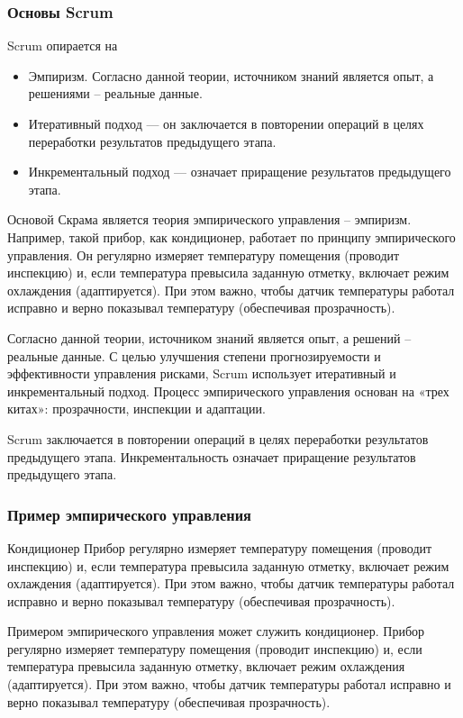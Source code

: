 \documentclass{../industrial-development}
\begin{document}
\begin{frame} \frametitle{Основы Scrum}
  \begin{block}{Scrum опирается на}
\begin{itemize}
\item \alert{Эмпиризм.} Согласно данной теории, источником знаний является опыт, а решениями – реальные данные.
\item \alert{Итеративный подход} --- он заключается в повторении операций в целях переработки результатов предыдущего этапа.
\item	\alert{Инкрементальный подход} ---  означает приращение результатов предыдущего этапа.
\end{itemize} 
	\end{block}
 \end{frame} 

\lecturenotes
Основой Скрама является теория эмпирического управления – эмпиризм. Например, такой прибор, как кондиционер, работает по принципу эмпирического управления. Он регулярно измеряет температуру помещения (проводит инспекцию) и, если температура превысила заданную отметку, включает режим охлаждения (адаптируется). При этом важно, чтобы датчик температуры работал исправно и верно показывал температуру (обеспечивая прозрачность).

Согласно данной теории, источником знаний является опыт, а решений – реальные данные. С целью улучшения степени прогнозируемости и эффективности управления рисками, Scrum использует итеративный и инкрементальный подход. Процесс эмпирического управления основан на «трех китах»: прозрачности, инспекции и адаптации.

 Scrum заключается в повторении операций в целях переработки результатов предыдущего этапа. \alert{Инкрементальность} означает приращение результатов предыдущего этапа. 

\begin{frame} \frametitle{Пример эмпирического управления}
  \begin{block}{Кондиционер}
Прибор \alert{регулярно} измеряет температуру помещения \alert{(проводит инспекцию)} и, если температура превысила заданную отметку, включает режим охлаждения \alert{(адаптируется)}. 
При этом важно, чтобы датчик температуры работал исправно и верно показывал температуру \alert{(обеспечивая прозрачность)}.
	\end{block}
 \end{frame} 
\lecturenotes
Примером эмпирического управления может служить кондиционер. Прибор \alert{регулярно} измеряет температуру помещения \alert{(проводит инспекцию)} и, если температура превысила заданную отметку, включает режим охлаждения \alert{(адаптируется)}. При этом важно, чтобы датчик температуры работал исправно и верно показывал температуру \alert{(обеспечивая прозрачность)}.
\end{document}
